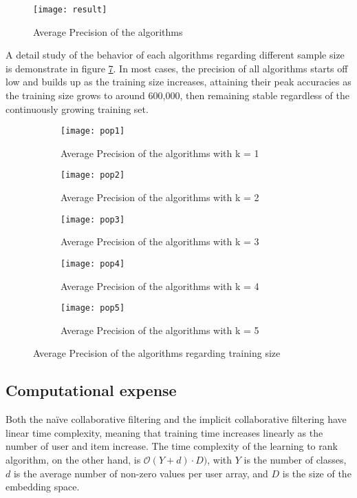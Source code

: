 \begin{figure}[h]
	\texttt{[image: result]}
	\centering
	\caption{Average Precision of the algorithms}
	\label{AP_result}
\end{figure}

\noindent A detail study of the behavior of each algorithms regarding different sample size is demonstrate in figure \ref{AP_with_training_size_result}. In most cases, the precision of all algorithms starts off low and builds up as the training size increases, attaining their peak accuracies as the training size grows to around 600,000, then remaining stable regardless of the continuously growing training set.

\begin{figure}[htbp]
  \begin{subfigure}[b]{0.3\textwidth}
    \texttt{[image: pop1]}
    \caption{Average Precision of the algorithms with k = 1}
    \label{fig:pop1}
  \end{subfigure}
  \hfill
  \begin{subfigure}[b]{0.3\textwidth}
    \texttt{[image: pop2]}
    \caption{Average Precision of the algorithms with k = 2}
    \label{fig:pop2}
  \end{subfigure}
  \hfill
  \begin{subfigure}[b]{0.3\textwidth}
    \texttt{[image: pop3]}
    \caption{Average Precision of the algorithms with k = 3}
    \label{fig:pop3}
  \end{subfigure}
  
   \bigskip
    \begin{subfigure}[b]{0.3\textwidth}
    \texttt{[image: pop4]}
    \caption{Average Precision of the algorithms with k = 4}
    \label{fig:pop4}
  \end{subfigure}
  \hfill
    \begin{subfigure}[b]{0.3\textwidth}
    \texttt{[image: pop5]}
    \caption{Average Precision of the algorithms with k = 5}
    \label{fig:pop5}
  \end{subfigure}
  \hfill
  \caption{Average Precision of the algorithms regarding training size}
  \label{AP_with_training_size_result}
\end{figure} 

\subsection{Computational expense}
Both the na\"ive collaborative filtering and the implicit collaborative filtering have linear time complexity, meaning that training time increases linearly as the number of user and item increase. The time complexity of the learning to rank algorithm, on the other hand, is \( \mathcal{O} (Y + d) \cdot D ) \), with \(Y\) is the number of classes, \(d\) is the average number of non-zero values per user array, and \(D\) is the size of the embedding space. 

